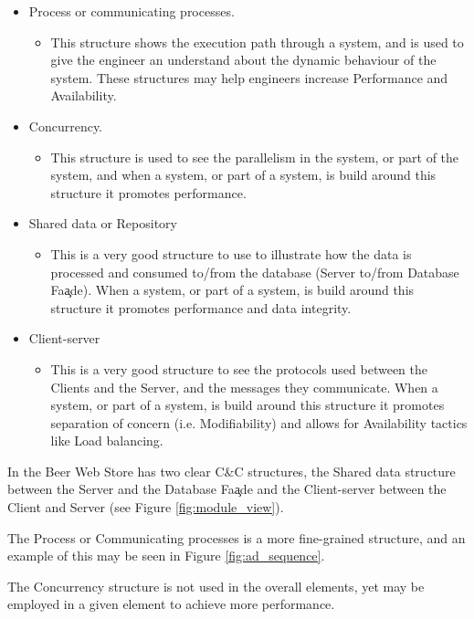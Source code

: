 \begin{itemize}
  \item Process or communicating processes.
	\begin{itemize}
	  \item This structure shows the execution path through a system, and is used to give the engineer an understand about the dynamic behaviour of the system. These structures may help engineers increase Performance and Availability.
	\end{itemize}
  \item Concurrency.
	\begin{itemize}
	  \item This structure is used to see the parallelism in the system, or part of the system, and when a system, or part of a system, is build around this structure it promotes performance. 
	\end{itemize}
  \item Shared data or Repository
	\begin{itemize}
	  \item This is a very good structure to use to illustrate how the data is processed and consumed to/from the database (Server to/from Database Fa\c ade). When a system, or part of a system, is build around this structure it promotes performance and data integrity. 
	\end{itemize}
  \item Client-server
	\begin{itemize}
  		\item This is a very good structure to see the protocols used between the Clients and the Server, and the messages they communicate. When a system, or part of a system, is build around this structure it promotes separation of concern (i.e. Modifiability) and allows for Availability tactics like Load balancing.
	\end{itemize}
\end{itemize}

In the Beer Web Store has two clear C\&C structures, the Shared data structure between the Server and the Database Fa\c ade and the Client-server between the Client and Server (see Figure \ref{fig:module_view}).

The Process or Communicating processes is a more fine-grained structure, and an example of this may be seen in Figure \ref{fig:ad_sequence}.

The Concurrency structure is not used in the overall elements, yet may be employed in a given element to achieve more performance.


